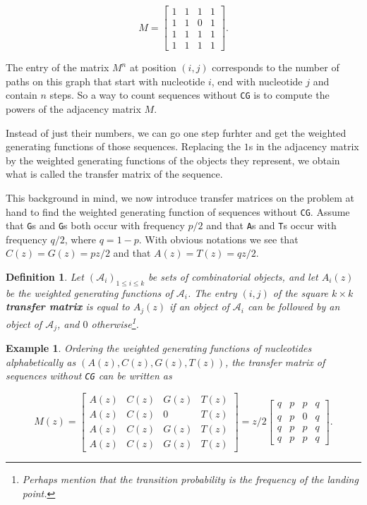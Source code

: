 \documentclass{article}
\newtheorem{definition}{Definition}
\newtheorem{example}{Example}
\begin{document}
\begin{equation*}
M = \left[
\begin{matrix}
1 & 1 & 1 & 1 \\
1 & 1 & 0 & 1 \\
1 & 1 & 1 & 1 \\
1 & 1 & 1 & 1
\end{matrix}
\right].
\end{equation*}

The entry of the matrix $M^n$ at position $(i,j)$ corresponds to the
number of paths on this graph that start with nucleotide $i$, end with
nucleotide $j$ and contain $n$ steps. So a way to count sequences without
\texttt{CG} is to compute the powers of the adjacency matrix $M$.

Instead of just their numbers, we can go one step furhter and get the
weighted generating functions of those sequences. Replacing the $1$s in the
adjacency matrix by the weighted generating functions of the objects they
represent, we obtain what is called the transfer matrix of the sequence.

This background in mind, we now introduce transfer matrices on the problem
at hand to find the weighted generating function of sequences without
\texttt{CG}.  Assume that \texttt{G}s and \texttt{G}s both occur with
frequency $p/2$ and that \texttt{A}s and \texttt{T}s occur with frequency
$q/2$, where $q = 1-p$. With obvious notations we see that $C(z) = G(z) =
pz/2$ and that $A(z) = T(z) = qz/2$.

\begin{definition}
\label{def:transfermat}
Let $(\mathcal{A}_i)_{1 \leq i \leq k}$ be sets of combinatorial objects,
and let $A_i(z)$ be the weighted generating functions of $\mathcal{A}_i$.
The entry $(i,j)$ of the square $k\times k$ \textbf{transfer matrix} is
equal to $A_j(z)$ if an object of $\mathcal{A}_i$ can be followed by an
object of $\mathcal{A}_j$, and $0$ otherwise\footnote{Perhaps mention that
the transition probability is the frequency of the landing point.}.
\end{definition}

\begin{example}
\label{ex:CGmat}
Ordering the weighted generating functions of nucleotides alphabetically
as $(A(z), C(z), G(z), T(z))$, the transfer matrix of sequences without
\texttt{CG} can be written as

\begin{equation}
\label{eq:Mz_CG}
M(z) = \left[
\begin{matrix}
A(z) & C(z) & G(z) & T(z) \\
A(z) & C(z) &  0   & T(z) \\
A(z) & C(z) & G(z) & T(z) \\
A(z) & C(z) & G(z) & T(z)
\end{matrix}
\right] = z/2 \left[
\begin{matrix}
q & p & p & q \\
q & p & 0 & q \\
q & p & p & q \\
q & p & p & q
\end{matrix}
\right].
\end{equation}
\end{example}
\end{document}
